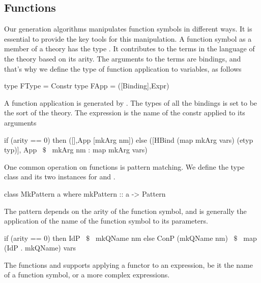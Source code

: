 \subsection{Functions}
\label{subsec:generation:functions}
Our generation algorithms manipulates function symbols in different ways. It is essential to provide the key tools for this manipulation. A function symbol as a member of a theory has the type . It contributes to the terms in the language of the theory based on its arity. The arguments to the terms are bindings, and that's why we define the type  of function application to variables, as follows 
\begin{hscode}
type FType = Constr
type FApp = ([Binding],Expr)
\end{hscode}
A function application is generated by . The types of all the bindings is set to be the sort of the theory. The expression is the name of the constr applied to its arguments 
\begin{hscode} 
 if (arity == 0) then ([],App [mkArg nm])
 else ([HBind (map mkArg vars) (etyp typ)],
            App ~$\$$~ mkArg nm : map mkArg vars)   
\end{hscode} 

One common operation on functions is pattern matching. We define the type class  and its two instances for  and . 
\begin{hscode}
class MkPattern a where
  mkPattern :: a -> Pattern
\end{hscode} 
The pattern depends on the arity of the function symbol, and is generally the application of the name of the function symbol to its parameters. 
\begin{hscode} 
 if (arity == 0)
 then IdP ~$\$$~ mkQName nm 
 else ConP (mkQName nm) ~$\$$~ map (IdP . mkQName) vars 
\end{hscode} 

The functions  and  supports applying a functor to an expression, be it the name of a function symbol, or a more complex expressions.

